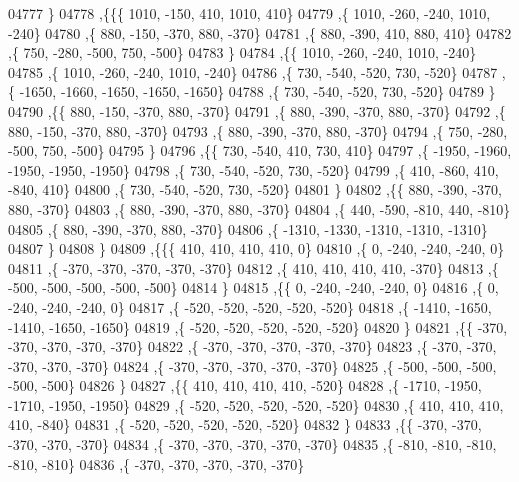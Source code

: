 \begin{DoxyCode}
04777    \}
04778   ,\{\{\{  1010,  -150,   410,  1010,   410\}
04779     ,\{  1010,  -260,  -240,  1010,  -240\}
04780     ,\{   880,  -150,  -370,   880,  -370\}
04781     ,\{   880,  -390,   410,   880,   410\}
04782     ,\{   750,  -280,  -500,   750,  -500\}
04783     \}
04784    ,\{\{  1010,  -260,  -240,  1010,  -240\}
04785     ,\{  1010,  -260,  -240,  1010,  -240\}
04786     ,\{   730,  -540,  -520,   730,  -520\}
04787     ,\{ -1650, -1660, -1650, -1650, -1650\}
04788     ,\{   730,  -540,  -520,   730,  -520\}
04789     \}
04790    ,\{\{   880,  -150,  -370,   880,  -370\}
04791     ,\{   880,  -390,  -370,   880,  -370\}
04792     ,\{   880,  -150,  -370,   880,  -370\}
04793     ,\{   880,  -390,  -370,   880,  -370\}
04794     ,\{   750,  -280,  -500,   750,  -500\}
04795     \}
04796    ,\{\{   730,  -540,   410,   730,   410\}
04797     ,\{ -1950, -1960, -1950, -1950, -1950\}
04798     ,\{   730,  -540,  -520,   730,  -520\}
04799     ,\{   410,  -860,   410,  -840,   410\}
04800     ,\{   730,  -540,  -520,   730,  -520\}
04801     \}
04802    ,\{\{   880,  -390,  -370,   880,  -370\}
04803     ,\{   880,  -390,  -370,   880,  -370\}
04804     ,\{   440,  -590,  -810,   440,  -810\}
04805     ,\{   880,  -390,  -370,   880,  -370\}
04806     ,\{ -1310, -1330, -1310, -1310, -1310\}
04807     \}
04808    \}
04809   ,\{\{\{   410,   410,   410,   410,     0\}
04810     ,\{     0,  -240,  -240,  -240,     0\}
04811     ,\{  -370,  -370,  -370,  -370,  -370\}
04812     ,\{   410,   410,   410,   410,  -370\}
04813     ,\{  -500,  -500,  -500,  -500,  -500\}
04814     \}
04815    ,\{\{     0,  -240,  -240,  -240,     0\}
04816     ,\{     0,  -240,  -240,  -240,     0\}
04817     ,\{  -520,  -520,  -520,  -520,  -520\}
04818     ,\{ -1410, -1650, -1410, -1650, -1650\}
04819     ,\{  -520,  -520,  -520,  -520,  -520\}
04820     \}
04821    ,\{\{  -370,  -370,  -370,  -370,  -370\}
04822     ,\{  -370,  -370,  -370,  -370,  -370\}
04823     ,\{  -370,  -370,  -370,  -370,  -370\}
04824     ,\{  -370,  -370,  -370,  -370,  -370\}
04825     ,\{  -500,  -500,  -500,  -500,  -500\}
04826     \}
04827    ,\{\{   410,   410,   410,   410,  -520\}
04828     ,\{ -1710, -1950, -1710, -1950, -1950\}
04829     ,\{  -520,  -520,  -520,  -520,  -520\}
04830     ,\{   410,   410,   410,   410,  -840\}
04831     ,\{  -520,  -520,  -520,  -520,  -520\}
04832     \}
04833    ,\{\{  -370,  -370,  -370,  -370,  -370\}
04834     ,\{  -370,  -370,  -370,  -370,  -370\}
04835     ,\{  -810,  -810,  -810,  -810,  -810\}
04836     ,\{  -370,  -370,  -370,  -370,  -370\}

\end{DoxyCode}
